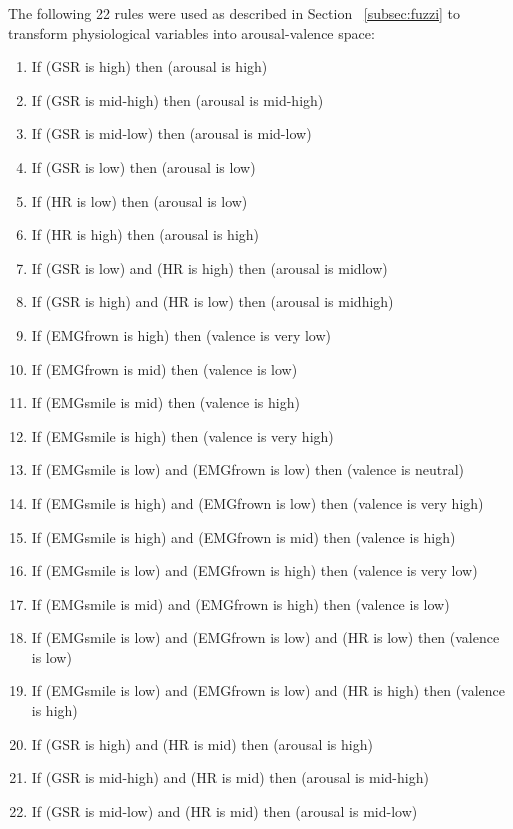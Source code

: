 
The following 22 rules were used as described in Section ~\ref{subsec:fuzzi} to transform physiological variables into arousal-valence space:

\begin{enumerate}
\item If (GSR is high) then (arousal is high)
\item If (GSR is mid-high) then (arousal is mid-high)
\item If (GSR is mid-low) then (arousal is mid-low)
\item If (GSR is low) then (arousal is low)
\item If (HR is low) then (arousal is low)
\item If (HR is high) then (arousal is high)
\item If (GSR is low) and (HR is high) then (arousal is midlow)
\item If (GSR is high) and (HR is low) then (arousal is midhigh)
\item If (EMGfrown is high) then (valence is very low)
\item If (EMGfrown is mid) then (valence is low)
\item If (EMGsmile is mid) then (valence is high)
\item If (EMGsmile is high) then (valence is very high)
\item If (EMGsmile is low) and (EMGfrown is low) then (valence is neutral)
\item If (EMGsmile is high) and (EMGfrown is low) then (valence is very high)
\item If (EMGsmile is high) and (EMGfrown is mid) then (valence is high)
\item If (EMGsmile is low) and (EMGfrown is high) then (valence is very low)
\item If (EMGsmile is mid) and (EMGfrown is high) then (valence is low)
\item If (EMGsmile is low) and (EMGfrown is low) and (HR is low) then (valence is low)
\item If (EMGsmile is low) and (EMGfrown is low) and (HR is high) then (valence is high)
\item If (GSR is high) and (HR is mid) then (arousal is high)
\item If (GSR is mid-high) and (HR is mid) then (arousal is mid-high)
\item If (GSR is mid-low) and (HR is mid) then (arousal is mid-low)
\end{enumerate}
